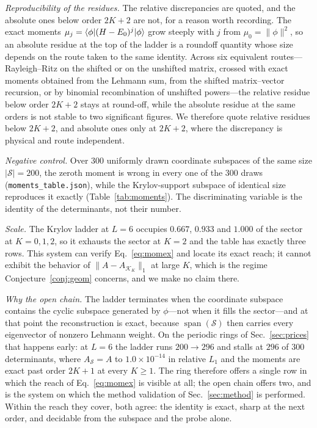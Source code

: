 \emph{Reproducibility of the residues.} The relative discrepancies are quoted, and the absolute ones
below order $2K{+}2$ are not, for a reason worth recording. The exact moments
$\mu_j=\langle \phi|(H-E_0)^{j}|\phi \rangle$ grow steeply with $j$ from $\mu_0=\lVert\phi\rVert^{2}$, so an
absolute residue at the top of the ladder is a roundoff quantity whose size depends on the
route taken to the same identity. Across six equivalent routes---Rayleigh--Ritz on the shifted or on
the unshifted matrix, crossed with exact moments obtained from the Lehmann sum, from the shifted
matrix--vector recursion, or by binomial recombination of unshifted powers---the relative residue below
order $2K{+}2$ stays at round-off, while the absolute residue at the same orders is not stable to two
significant figures. We therefore quote relative residues below $2K{+}2$, and absolute ones only at
$2K{+}2$, where the discrepancy is physical and route independent.

\emph{Negative control.} Over $300$ uniformly drawn coordinate subspaces of the same size
$|\mathcal S|=200$, the zeroth moment is wrong in every one of the $300$ draws
(\texttt{moments\_table.json}), while the Krylov-support subspace of identical size reproduces it
exactly (Table~\ref{tab:moments}). The discriminating variable is the identity of the determinants, not their number.

\emph{Scale.} The Krylov ladder at $L=6$ occupies $0.667$, $0.933$ and $1.000$ of the sector at
$K=0,1,2$, so it exhausts the sector at $K=2$ and the table has exactly three rows. This system can
verify Eq.~\eqref{eq:momex} and locate its exact reach; it cannot exhibit the behavior of
$\lVert A-A_{\mathcal K_K}\rVert_1$ at large $K$, which is the regime Conjecture~\ref{conj:geom}
concerns, and we make no claim there.

\emph{Why the open chain.} The ladder terminates when the coordinate subspace contains the cyclic
subspace generated by $\phi$---not when it fills the sector---and at that point the reconstruction is
exact, because $\operatorname{span}(\mathcal S)$ then carries every eigenvector of nonzero Lehmann
weight. On the periodic rings of Sec.~\ref{sec:prices} that happens early: at $L=6$ the ladder runs
$200\to296$ and stalls at $296$ of $300$ determinants, where $A_{\mathcal S}=A$ to
$1.0\times10^{-14}$ in relative $L_1$ and the moments are exact past order $2K{+}1$ at every $K\ge1$.
The ring therefore offers a single row in which the reach of Eq.~\eqref{eq:momex} is visible at all;
the open chain offers two, and is the system on which the method validation of Sec.~\ref{sec:method} is
performed. Within the reach they cover, both agree: the identity is exact, sharp at the next order, and
decidable from the subspace and the probe alone.

